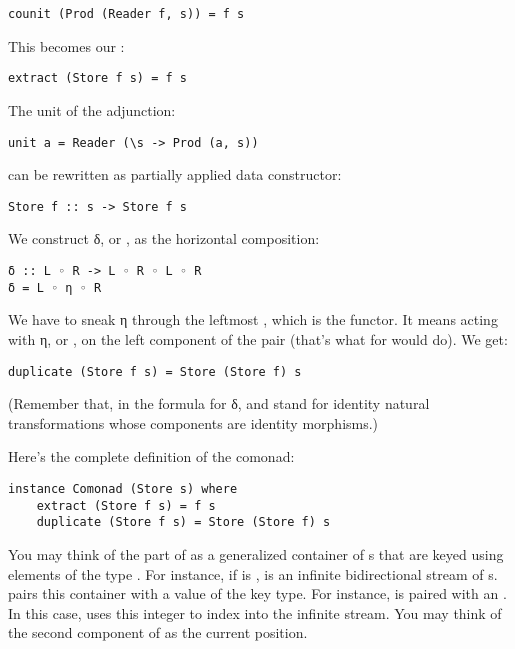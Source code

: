 \begin{Verbatim}[commandchars=\\\{\}]
counit (Prod (Reader f, s)) = f s
\end{Verbatim}
This becomes our :

\begin{Verbatim}[commandchars=\\\{\}]
extract (Store f s) = f s
\end{Verbatim}
The unit of the adjunction:

\begin{Verbatim}
unit a = Reader (\s -> Prod (a, s))
\end{Verbatim}
can be rewritten as partially applied data constructor:

\begin{Verbatim}[commandchars=\\\{\}]
Store f :: s -> Store f s
\end{Verbatim}
We construct δ, or , as the horizontal composition:

\begin{Verbatim}[commandchars=\\\{\}]
δ :: L ◦ R -> L ◦ R ◦ L ◦ R
δ = L ◦ η ◦ R
\end{Verbatim}
We have to sneak η through the leftmost , which is the
 functor. It means acting with η, or , on
the left component of the pair (that's what  for
 would do). We get:

\begin{Verbatim}[commandchars=\\\{\}]
duplicate (Store f s) = Store (Store f) s
\end{Verbatim}
(Remember that, in the formula for δ,  and  stand
for identity natural transformations whose components are identity
morphisms.)

Here's the complete definition of the  comonad:

\begin{Verbatim}[commandchars=\\\{\}]
instance Comonad (Store s) where
    extract (Store f s) = f s
    duplicate (Store f s) = Store (Store f) s
\end{Verbatim}
You may think of the  part of  as a
generalized container of s that are keyed using elements of
the type . For instance, if  is ,
 is an infinite bidirectional stream of
s.  pairs this container with a value of the key
type. For instance,  is paired with an
. In this case,  uses this integer to index
into the infinite stream. You may think of the second component of
 as the current position.

